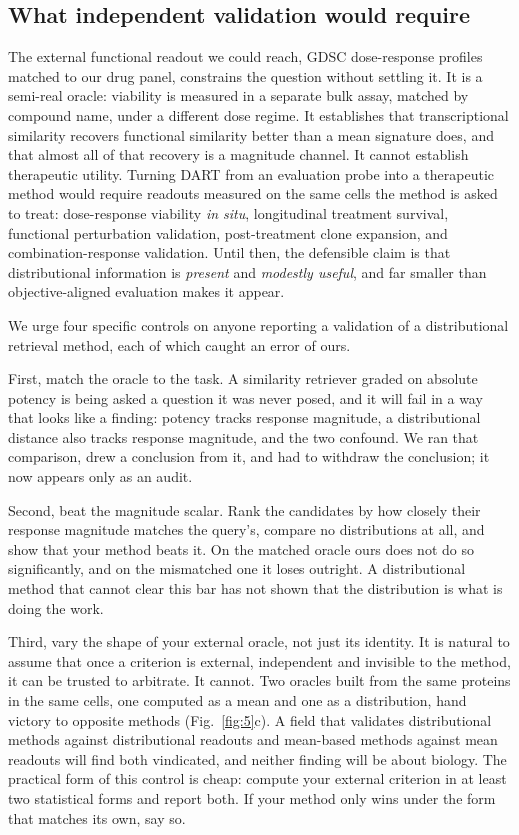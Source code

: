 \documentclass[11pt,letterpaper]{article}
\begin{document}
\subsection*{What independent validation would require}

The external functional readout we could reach, GDSC dose-response profiles matched to our drug
panel, constrains the question without settling it. It is a semi-real oracle: viability is
measured in a separate bulk assay, matched by compound name, under a different dose regime. It
establishes that transcriptional similarity recovers functional similarity better than a mean
signature does, and that almost all of that recovery is a magnitude channel. It cannot establish
therapeutic utility. Turning DART from an evaluation probe into a therapeutic method would require
readouts measured on the same cells the method is asked to treat: dose-response viability
\emph{in situ}, longitudinal treatment survival, functional perturbation validation,
post-treatment clone expansion, and combination-response validation. Until then, the defensible
claim is that distributional information is \textit{present} and \textit{modestly useful}, and far
smaller than objective-aligned evaluation makes it appear.

We urge four specific controls on anyone reporting a validation of a distributional retrieval
method, each of which caught an error of ours.

First, match the oracle to the task. A similarity retriever graded on absolute potency is
being asked a question it was never posed, and it will fail in a way that looks like a finding:
potency tracks response magnitude, a distributional distance also tracks response magnitude, and
the two confound. We ran that comparison, drew a conclusion from it, and had to withdraw the
conclusion; it now appears only as an audit.

Second, beat the magnitude scalar. Rank the candidates by how closely their response
magnitude matches the query's, compare no distributions at all, and show that your method beats it.
On the matched oracle ours does not do so significantly, and on the mismatched one it loses
outright. A distributional method that cannot clear this bar has not shown that the distribution is
what is doing the work.

Third, vary the shape of your external oracle, not just its identity. It is natural to
assume that once a criterion is external, independent and invisible to the method, it can be
trusted to arbitrate. It cannot. Two oracles built from the same proteins in the same cells, one
computed as a mean and one as a distribution, hand victory to opposite methods (Fig.~\ref{fig:5}c).
A field that validates distributional methods against distributional readouts and mean-based methods
against mean readouts will find both vindicated, and neither finding will be about biology. The
practical form of this control is cheap: compute your external criterion in at least two statistical
forms and report both. If your method only wins under the form that matches its own, say so.
\end{document}
